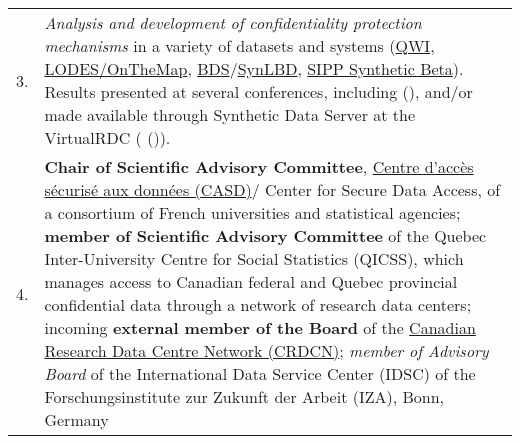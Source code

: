 \documentclass[10pt,letterpaper]{article}
\begin{document}
\begin{longtable}{lp{6.3in}}

3. &{{\it Analysis and development of confidentiality protection mechanisms} in a variety of 
datasets and systems (\href{http://lehd.ces.census.gov/data}{QWI}, 
\href{http://lehd.ces.census.gov/data}{LODES/OnTheMap}, 
\href{https://www.census.gov/ces/dataproducts/bds/}{BDS}/\href{https://www.census.gov/ces/dataproducts/synlbd/index.html}{SynLBD},
\href{http://www.census.gov/programs-surveys/sipp/methodology/sipp-synthetic-beta-data-product.html}{SIPP
 Synthetic Beta}). Results presented
   at several conferences, including \citeauthor*{AbowdEtAl2012} (\citeyear{AbowdEtAl2012})}, 
   and/or made available through Synthetic Data Server at the VirtualRDC (\citeauthor{vrdc} 
   (\citeyear{vrdc})).\\

4. & {{ \bf Chair of Scientific Advisory Committee}, \href{https://casd.eu}{Centre d'acc\`es s\'ecuris\'e aux donn\'ees (CASD)}/ Center for Secure Data Access, of a consortium of French universities and statistical agencies;
	 \textbf{member of Scientific Advisory Committee} of the Quebec Inter-University Centre for Social Statistics (QICSS), which manages access to Canadian federal and Quebec provincial confidential data through a network of research data centers; incoming \textbf{external member of the Board} of the \href{https://crdcn.org/crdcn-inaugural-board}{Canadian Research Data Centre Network (CRDCN)};
     \textit{member of Advisory Board } of the International Data Service Center (IDSC) of the  Forschungsinstitute zur Zukunft der Arbeit (IZA), Bonn, Germany}\\



\end{longtable}
\end{document}
